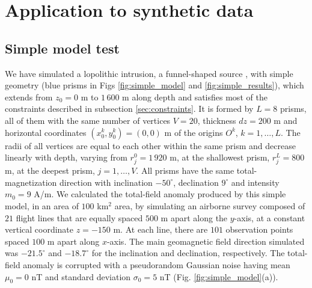\section{Application to synthetic data}\label{sec:synthetic}

\subsection{Simple model test}

We have simulated a lopolithic intrusion, a funnel-shaped source \cite[]{cawthorn-2018}, with simple geometry (blue prisms in Figs \ref{fig:simple_model} and \ref{fig:simple_results}), which extends from $z_0=0$ m to $1\,600$ m along depth and satisfies most of the constraints described in subsection \ref{sec:constraints}. It is formed by $L=8$ prisms, all of them with the same number of vertices $ V = 20 $, thickness $ dz = 200 $ m and horizontal coordinates $ (x_0^k, y_0^k) = (0, 0) $ m of the origins $O^k$, $k=1,\dots,L$. The radii of all vertices are equal to each other within the same prism and decrease linearly with depth, varying from $r_j^0=1\,920$ m, at the shallowest prism, $r_j^L=800$ m, at the deepest prism, $j=1,\dots, V$. All prisms have the same total-magnetization direction with inclination $ -50^\circ $, declination $ 9^\circ $ and intensity $ m_0 = 9 $ A/m. We calculated the total-field anomaly produced by this simple model, in an area of $ 100 $ km$^2$ area, by simulating an airborne survey composed of $ 21 $ flight lines that are equally spaced $ 500 $ m apart along the $ y $-axis, at a constant vertical coordinate $ z = -150 $ m. At each line, there are $ 101 $ observation points spaced $100$ m apart along $ x $-axis. 
The main geomagnetic field direction simulated was $ -21.5^\circ $ and $ -18.7^\circ $ for the inclination and declination, respectively. 
The total-field anomaly is corrupted with a pseudorandom Gaussian noise having mean $ \mu_0=0 $ nT and standard deviation $ \sigma_0 = 5 $ nT (Fig. \ref{fig:simple_model}(a)).


